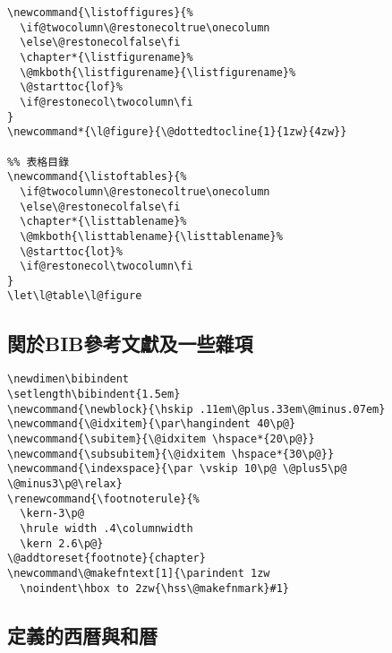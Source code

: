 \begin{lstlisting}[firstnumber=1353]
%% 圖片目錄
\newcommand{\listoffigures}{%
  \if@twocolumn\@restonecoltrue\onecolumn
  \else\@restonecolfalse\fi
  \chapter*{\listfigurename}%
  \@mkboth{\listfigurename}{\listfigurename}%
  \@starttoc{lof}%
  \if@restonecol\twocolumn\fi
}
\newcommand*{\l@figure}{\@dottedtocline{1}{1zw}{4zw}}

%% 表格目錄
\newcommand{\listoftables}{%
  \if@twocolumn\@restonecoltrue\onecolumn
  \else\@restonecolfalse\fi
  \chapter*{\listtablename}%
  \@mkboth{\listtablename}{\listtablename}%
  \@starttoc{lot}%
  \if@restonecol\twocolumn\fi
}
\let\l@table\l@figure
\end{lstlisting}


\subsection{関於BIB參考文獻及一些雜項}

\begin{lstlisting}[firstnumber=1375]
\newdimen\bibindent
\setlength\bibindent{1.5em}
\newcommand{\newblock}{\hskip .11em\@plus.33em\@minus.07em}
\newcommand{\@idxitem}{\par\hangindent 40\p@}
\newcommand{\subitem}{\@idxitem \hspace*{20\p@}}
\newcommand{\subsubitem}{\@idxitem \hspace*{30\p@}}
\newcommand{\indexspace}{\par \vskip 10\p@ \@plus5\p@ \@minus3\p@\relax}
\renewcommand{\footnoterule}{%
  \kern-3\p@
  \hrule width .4\columnwidth
  \kern 2.6\p@}
\@addtoreset{footnote}{chapter}
\newcommand\@makefntext[1]{\parindent 1zw
  \noindent\hbox to 2zw{\hss\@makefnmark}#1}
\end{lstlisting}


\subsection{定義的西暦與和暦}

